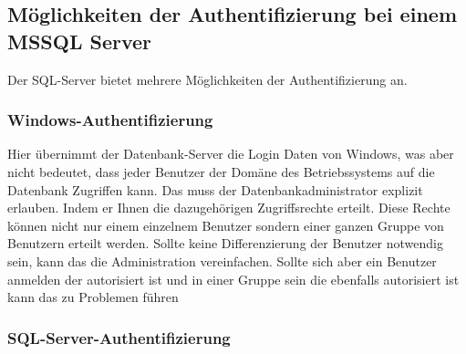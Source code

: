 \break
\break
\break 
\subsection{Möglichkeiten der Authentifizierung bei einem MSSQL Server}

Der SQL-Server bietet mehrere Möglichkeiten der Authentifizierung an. 

\subsubsection{Windows-Authentifizierung}

Hier übernimmt der Datenbank-Server die Login Daten von Windows, was aber nicht bedeutet, dass jeder Benutzer der Domäne des Betriebssystems auf die Datenbank Zugriffen kann. Das muss der Datenbankadministrator explizit erlauben. Indem er Ihnen die dazugehörigen Zugriffsrechte erteilt. Diese Rechte können nicht nur einem einzelnem Benutzer sondern einer ganzen Gruppe von Benutzern erteilt werden. Sollte keine Differenzierung der Benutzer notwendig sein, kann das die Administration vereinfachen. Sollte sich aber ein Benutzer anmelden der autorisiert ist und in einer Gruppe sein die ebenfalls autorisiert ist kann das zu Problemen führen

\subsubsection{SQL-Server-Authentifizierung}

